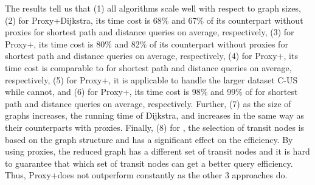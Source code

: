 The results tell us that (1) all algorithms scale well with respect to graph sizes, (2) for Proxy+Dijkstra, its time cost is 68\% and 67\% of  its counterpart without proxies for shortest path and distance queries on average, respectively, (3) for Proxy+\arcflag, its time cost is 80\% and 82\% of its counterpart without proxies for shortest  path and distance queries on average, respectively, (4) for Proxy+\tnr, its time cost is comparable to \tnr for shortest path and distance queries on average, respectively, (5) for Proxy+\tnr, it is applicable to handle the larger dataset C-US while \tnr cannot, and (6) for Proxy+\ah, its time cost is 98\% and 99\% of \ah for shortest path and distance queries on average, respectively. Further, (7) as the size of graphs increases, the running time of Dijkstra, \arcflag and \ah increases in the same way as their counterparts with proxies. Finally, (8) for \tnr, the selection of transit nodes is based on the graph structure and has a significant effect on the efficiency. By using proxies, the reduced graph has a different set of transit nodes and it is hard to guarantee that which set of transit nodes can get a better query efficiency. Thus, Proxy+\tnr does not outperform \tnr constantly as the other 3 approaches do.   %

